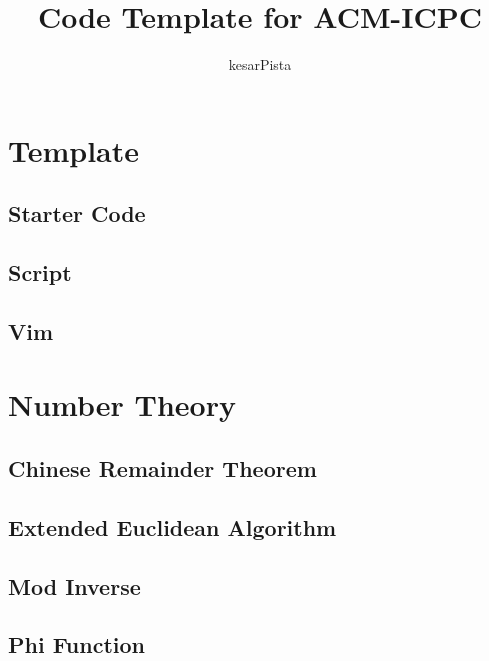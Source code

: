\documentclass[a4paper, twocolumn]{article}
\title{Code Template for ACM-ICPC}
\author{kesarPista}
\begin{document}
\begin{titlepage}
\maketitle
\thispagestyle{empty}
\pagebreak
\pagestyle{fancy}
\lhead{}
\rhead{}
\cfoot{}
\tableofcontents
\end{titlepage}

\pagestyle{fancy}
\cfoot{- \thepage \ -}
  
\section{Template}
\subsection{Starter Code}

\subsection{Script}

\subsection{Vim}


\section{Number Theory}
\subsection{Chinese Remainder Theorem}

\subsection{Extended Euclidean Algorithm}

\subsection{Mod Inverse}

\subsection{Phi Function}

\end{document}
